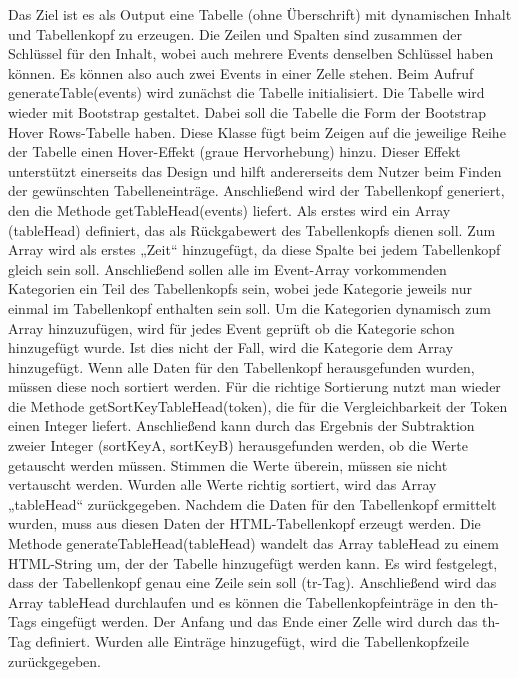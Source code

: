 {Das Ziel ist es als Output eine Tabelle (ohne Überschrift) mit dynamischen Inhalt und Tabellenkopf zu erzeugen. Die Zeilen und Spalten sind zusammen der Schlüssel für den Inhalt, wobei auch mehrere Events denselben Schlüssel haben können. Es können also auch zwei Events in einer Zelle stehen. 
Beim Aufruf generateTable(events) wird zunächst die Tabelle initialisiert. Die Tabelle wird wieder mit Bootstrap gestaltet. Dabei soll die Tabelle die Form der Bootstrap Hover Rows-Tabelle haben. Diese Klasse fügt beim Zeigen auf die jeweilige Reihe der Tabelle einen Hover-Effekt (graue Hervorhebung) hinzu.  Dieser Effekt unterstützt einerseits das Design und hilft andererseits dem Nutzer beim Finden der gewünschten Tabelleneinträge. 
Anschließend wird der Tabellenkopf generiert, den die Methode getTableHead(events) liefert. Als erstes wird ein Array (tableHead) definiert, das als Rückgabewert des Tabellenkopfs dienen soll. Zum Array wird als erstes „Zeit“ hinzugefügt, da diese Spalte bei jedem Tabellenkopf gleich sein soll. Anschließend sollen alle im Event-Array vorkommenden Kategorien ein Teil des Tabellenkopfs sein, wobei jede Kategorie jeweils nur einmal im Tabellenkopf enthalten sein soll. Um die Kategorien dynamisch zum Array hinzuzufügen, wird für jedes Event geprüft ob die Kategorie schon hinzugefügt wurde. Ist dies nicht der Fall, wird die Kategorie dem Array hinzugefügt. Wenn alle Daten für den Tabellenkopf herausgefunden wurden, müssen diese noch sortiert werden. Für die richtige Sortierung nutzt man wieder die Methode getSortKeyTableHead(token), die für die Vergleichbarkeit der Token einen Integer liefert. Anschließend kann durch das Ergebnis der Subtraktion zweier Integer (sortKeyA, sortKeyB) herausgefunden werden, ob die Werte getauscht werden müssen. Stimmen die Werte überein, müssen sie nicht vertauscht werden. Wurden alle Werte richtig sortiert, wird das Array „tableHead“ zurückgegeben.
Nachdem die Daten für den Tabellenkopf ermittelt wurden, muss aus diesen Daten der HTML-Tabellenkopf erzeugt werden. Die Methode generateTableHead(tableHead) wandelt das Array tableHead zu einem HTML-String um, der der Tabelle hinzugefügt werden kann. Es wird festgelegt, dass der Tabellenkopf genau eine Zeile sein soll (tr-Tag). Anschließend wird das Array tableHead durchlaufen und es können die Tabellenkopfeinträge in den th-Tags eingefügt werden. Der Anfang und das Ende einer Zelle wird durch das th-Tag definiert. Wurden alle Einträge hinzugefügt, wird die Tabellenkopfzeile zurückgegeben.

}
